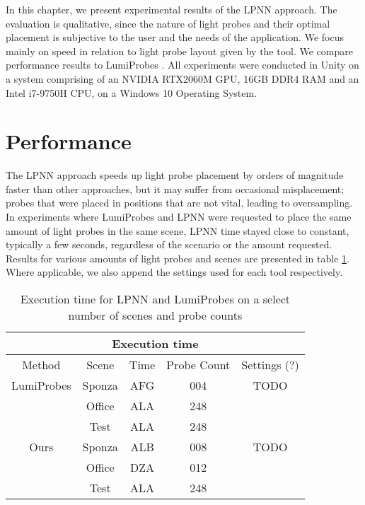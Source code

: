 In this chapter, we present experimental results of the LPNN approach. The evaluation is qualitative, since the nature of light probes and their optimal placement is subjective to the user and the needs of the application. We focus mainly on speed in relation to light probe layout given by the tool. We compare performance results to LumiProbes \parencite{Vardis2021}. All experiments were conducted in Unity on a system comprising of an NVIDIA RTX2060M GPU, 16GB DDR4 RAM and an Intel i7-9750H CPU, on a Windows 10 Operating System.

\section{Performance}
\label{sec:4_performance}
The LPNN approach speeds up light probe placement by orders of magnitude faster than other approaches, but it may suffer from occasional misplacement; probes that were placed in positions that are not vital, leading to oversampling. In experiments where LumiProbes and LPNN were requested to place the same amount of light probes in the same scene, LPNN time stayed close to constant, typically a few seconds, regardless of the scenario or the amount requested. Results for various amounts of light probes and scenes are presented in table \ref{table:times}. Where applicable, we also append the settings used for each tool respectively.

\begin{table}
	\centering
\begin{tabular}{ |c||c|c|c|c|  }
	\hline
	\multicolumn{5}{|c|}{Execution time} \\
	\hline
	Method & Scene & Time & Probe Count & Settings (?)\\
	\hline
	LumiProbes & Sponza    & AFG   & 004 & TODO \\
	           & Office    & ALA   & 248 &      \\
	           & Test      & ALA   & 248 &      \\
	\hline
	Ours       & Sponza    & ALB   & 008 & TODO \\
               & Office    & DZA   & 012 &      \\
               & Test      & ALA   & 248 &      \\
	\hline
\end{tabular}
\caption{Execution time for LPNN and LumiProbes on a select number of scenes and probe counts}
\label{table:times}
\end{table}

